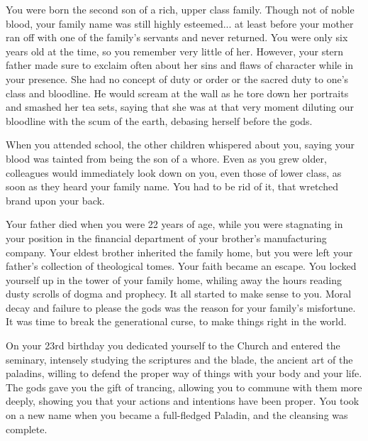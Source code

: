 \documentclass[char]{guildcamp3}
\begin{document}
\name{\cPaladin{}}



You were born the second son of a rich, upper class family. Though not of noble blood, your family name was still highly esteemed... at least before your mother ran off with one of the family's servants and never returned. You were only six years old at the time, so you remember very little of her. However, your stern father made sure to exclaim often about her sins and flaws of character while in your presence. She had no concept of duty or order or the sacred duty to one's class and bloodline. He would scream at the wall as he tore down her portraits and smashed her tea sets, saying that she was at that very moment diluting our bloodline with the scum of the earth, debasing herself before the gods.

When you attended school, the other children whispered about you, saying your blood was tainted from being the son of a whore. Even as you grew older, colleagues would immediately look down on you, even those of lower class, as soon as they heard your family name. You had to be rid of it, that wretched brand upon your back.

Your father died when you were 22 years of age, while you were stagnating in your position in the financial department of your brother's manufacturing company. Your eldest brother inherited the family home, but you were left your father's collection of theological tomes. Your faith became an escape. You locked yourself up in the tower of your family home, whiling away the hours reading dusty scrolls of dogma and prophecy. It all started to make sense to you. Moral decay and failure to please the gods was the reason for your family's misfortune. It was time to break the generational curse, to make things right in the world.

On your 23rd birthday you dedicated yourself to the Church and entered the seminary, intensely studying the scriptures and the blade, the ancient art of the paladins, willing to defend the proper way of things with your body and your life. The gods gave you the gift of trancing, allowing you to commune with them more deeply, showing you that your actions and intentions have been proper. You took on a new name when you became a full-fledged Paladin, and the cleansing was complete.
\end{document}
